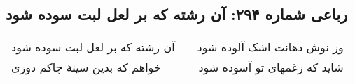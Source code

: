 \begin{center}
\section*{رباعی شماره ۲۹۴: آن رشته که بر لعل لبت سوده شود}
\label{sec:sh294}
\begin{longtable}{l p{0.5cm} r}
آن رشته که بر لعل لبت سوده شود
&&
وز نوش دهانت اشک آلوده شود
\\
خواهم که بدین سینهٔ چاکم دوزی
&&
شاید که زغمهای تو آسوده شود
\\
\end{longtable}
\end{center}
